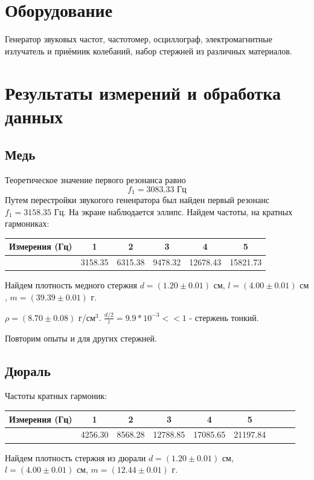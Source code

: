 \documentclass[a4, 12pt]{article}
\begin{document}
\section{Оборудование}
Генератор звуковых частот, частотомер, осциллограф,
электромагнитные излучатель и приёмник колебаний, набор стержней из различных материалов.
\pagebreak
\section{Результаты измерений и обработка данных}

\subsection{Медь}
	Теоретическое значение первого резонанса равно
	\[f_1 = 3083.33 \text{ Гц}\] 
	Путем перестройки звукогого гененратора был найден первый резонанс $f_1 = 3158.35$ Гц. На экране наблюдается эллипс.
	Найдем частоты, на кратных гармониках: 
	\begin{center}
		\begin{tabular}{|c||c|c|c|c|c|}
			\hline
			Измерения (Гц) & 1 & 2 & 3 & 4 & 5\\
			\hline
			& 3158.35 & 6315.38 & 9478.32 & 12678.43 & 15821.73 \\
			\hline
		\end{tabular}
	\end{center}
	Найдем плотность медного стержня $d = (1.20 \pm 0.01) \text{ см}$, $l = (4.00 \pm 0.01) \text{ см}$, $m = (39.39 \pm 0.01) \text{ г}$.
	
	$\rho = (8.70 \pm 0.08)$ г/см$^3$.
 $\frac{d / 2}{l} = 9.9 * 10^{-3} << 1$ - стержень тонкий.
	
	Повторим опыты и для других стержней.
 \subsection{Дюраль}
	Частоты кратных гармоник: 
	\begin{center}
		\begin{tabular}{|c||c|c|c|c|c|c|c|c|}
			\hline
			Измерения (Гц) & 1 & 2 & 3 & 4 & 5 \\
			\hline
			& 4256.30 & 8568.28 & 12788.85 & 17085.65 & 21197.84 \\
			\hline
		\end{tabular}
	\end{center}
	
	Найдем плотность стержня из дюрали $d = (1.20 \pm 0.01) \text{ см}$, $l = (4.00 \pm 0.01) \text{ см}$, $m = (12.44 \pm 0.01) \text{ г}$.
	
\end{document}
